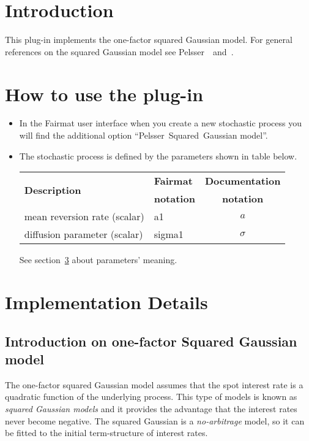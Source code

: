 \newcommand{\pluginName}{Pelsser Model}
\newcommand{\pluginVersion}{1.0.11}




\PluginTitle{\pluginName}{\pluginVersion}

\section{Introduction}
This plug-in implements the one-factor squared Gaussian model. For general references on the squared Gaussian model see Pelsser~\cite{BookPelsser}~and~\cite{ArtPelsser}.
\section{How to use the plug-in}
\begin{itemize}
  \item In the Fairmat user interface when you create a new stochastic process you will find the additional option ``Pelsser~Squared~Gaussian model''.
  \item The stochastic process is defined by the parameters shown in table below.

\begin{center}
\begin{tabular}{|l|l|c|}
  \hline
 \multirow{2}{*}{\textbf{Description}}& \textbf{Fairmat}&\textbf{Documentation}\\
                     & \textbf{notation}&\textbf{notation}\\
                     \hline
 mean reversion rate    (scalar)        & a1        & $a$\\
 diffusion parameter    (scalar)        & sigma1    & $\sigma$\\
   \hline
\end{tabular}
\end{center}
See section~\ref{id} about parameters' meaning.
\end{itemize}

\section{Implementation Details}
\label{id}

\subsection{Introduction on one-factor Squared Gaussian model}
The one-factor squared Gaussian model assumes that the spot interest rate is a quadratic function of the underlying process. This type of models is known as \emph{squared Gaussian models} and it provides the advantage that the interest rates never become negative. The squared Gaussian is a \emph{no-arbitrage} model, so it can be fitted to the initial term-structure of interest rates.

